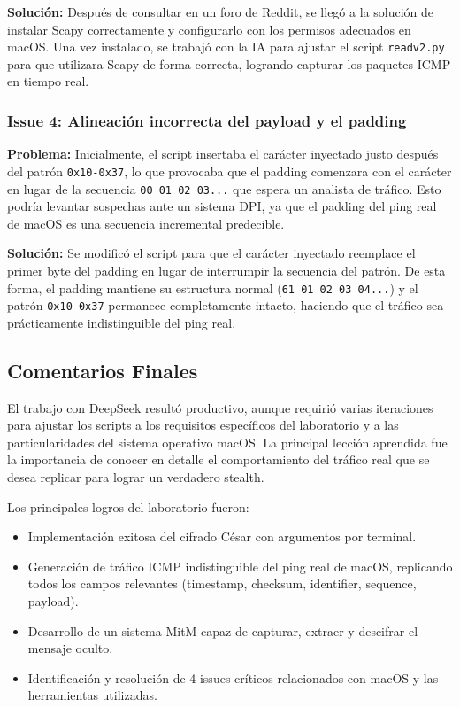 \documentclass[letter,12pt]{article}
\begin{document}
\textbf{Solución:} Después de consultar en un foro de Reddit, se llegó a la solución de instalar Scapy correctamente y configurarlo con los permisos adecuados en macOS. Una vez instalado, se trabajó con la IA para ajustar el script \texttt{readv2.py} para que utilizara Scapy de forma correcta, logrando capturar los paquetes ICMP en tiempo real.

\subsubsection*{Issue 4: Alineación incorrecta del payload y el padding}

\textbf{Problema:} Inicialmente, el script insertaba el carácter inyectado justo después del patrón \texttt{0x10-0x37}, lo que provocaba que el padding comenzara con el carácter en lugar de la secuencia \texttt{00 01 02 03...} que espera un analista de tráfico. Esto podría levantar sospechas ante un sistema DPI, ya que el padding del ping real de macOS es una secuencia incremental predecible.

\textbf{Solución:} Se modificó el script para que el carácter inyectado reemplace el primer byte del padding en lugar de interrumpir la secuencia del patrón. De esta forma, el padding mantiene su estructura normal (\texttt{61 01 02 03 04...}) y el patrón \texttt{0x10-0x37} permanece completamente intacto, haciendo que el tráfico sea prácticamente indistinguible del ping real.

\subsection{Comentarios Finales}

El trabajo con DeepSeek resultó productivo, aunque requirió varias iteraciones para ajustar los scripts a los requisitos específicos del laboratorio y a las particularidades del sistema operativo macOS. La principal lección aprendida fue la importancia de conocer en detalle el comportamiento del tráfico real que se desea replicar para lograr un verdadero stealth.

Los principales logros del laboratorio fueron:
\begin{itemize}
    \item Implementación exitosa del cifrado César con argumentos por terminal.
    \item Generación de tráfico ICMP indistinguible del ping real de macOS, replicando todos los campos relevantes (timestamp, checksum, identifier, sequence, payload).
    \item Desarrollo de un sistema MitM capaz de capturar, extraer y descifrar el mensaje oculto.
    \item Identificación y resolución de 4 issues críticos relacionados con macOS y las herramientas utilizadas.
\end{itemize}
\end{document}
